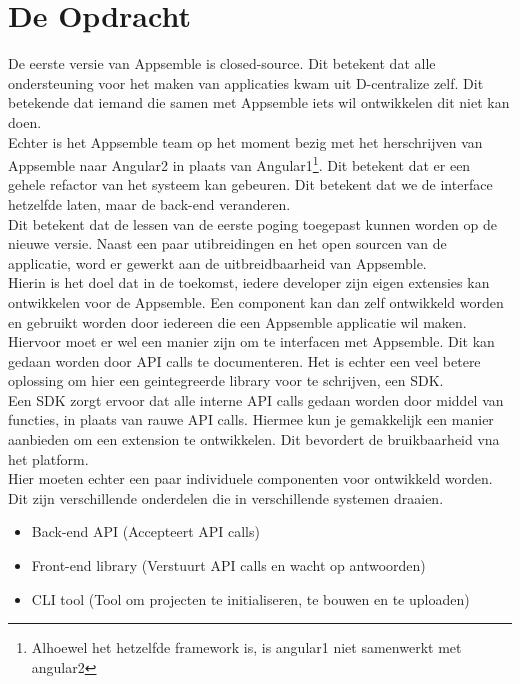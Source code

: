 \chapter{De Opdracht}

De eerste versie van Appsemble is closed-source. Dit betekent dat alle ondersteuning voor het maken van applicaties kwam uit D-centralize zelf. Dit betekende dat iemand die samen met Appsemble iets wil ontwikkelen dit niet kan doen. \\

Echter is het Appsemble team op het moment bezig met het herschrijven van Appsemble naar Angular2 in plaats van Angular1\footnote{Alhoewel het hetzelfde framework is, is angular1 niet samenwerkt met angular2\cite{angular1}}. Dit betekent dat er een gehele refactor van het systeem kan gebeuren. Dit betekent dat we de interface hetzelfde laten, maar de back-end veranderen.\\

Dit betekent dat de lessen van de eerste poging toegepast kunnen worden op de nieuwe versie. Naast een paar utibreidingen en het open sourcen van de applicatie, word er gewerkt aan de uitbreidbaarheid van Appsemble.\\

Hierin is het doel dat in de toekomst, iedere developer zijn eigen extensies kan ontwikkelen voor de Appsemble. Een component kan dan zelf ontwikkeld worden en gebruikt worden door iedereen die een Appsemble applicatie wil maken.\\

Hiervoor moet er wel een manier zijn om te interfacen met Appsemble. Dit kan gedaan worden door API calls te documenteren. Het is echter een veel betere oplossing om hier een geintegreerde library voor te schrijven, een SDK.\\

Een SDK zorgt ervoor dat alle interne API calls gedaan worden  door middel van functies, in plaats van rauwe API calls. Hiermee kun je gemakkelijk een manier aanbieden om een extension te ontwikkelen. Dit bevordert de bruikbaarheid vna het platform.\\

Hier moeten echter een paar individuele componenten voor ontwikkeld worden. Dit zijn verschillende onderdelen die in verschillende systemen draaien. \\

\begin{itemize}
	\item Back-end API (Accepteert API calls)
	\item Front-end library (Verstuurt API calls en wacht op antwoorden)
	\item CLI tool (Tool om projecten te initialiseren, te bouwen en te uploaden)
\end{itemize}

